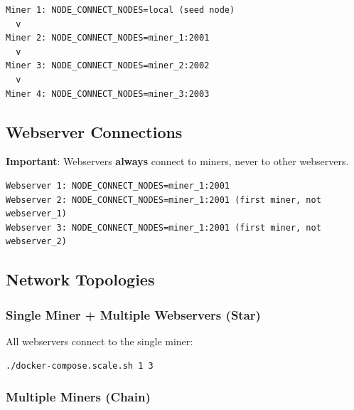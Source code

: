 \begin{listing}[htbp]
\caption{Miner Network Topology}
\label{lst:ch22-miner-chain}
\begin{verbatim}
Miner 1: NODE_CONNECT_NODES=local (seed node)
  v
Miner 2: NODE_CONNECT_NODES=miner_1:2001
  v
Miner 3: NODE_CONNECT_NODES=miner_2:2002
  v
Miner 4: NODE_CONNECT_NODES=miner_3:2003
\end{verbatim}
\end{listing}

\subsection{Webserver Connections}

\textbf{Important}: Webservers \textbf{always} connect to miners, never to other webservers.

\begin{listing}[H]
\caption{Webserver Network Topology}
\label{lst:ch22-webserver-topology}
\begin{verbatim}
Webserver 1: NODE_CONNECT_NODES=miner_1:2001
Webserver 2: NODE_CONNECT_NODES=miner_1:2001 (first miner, not webserver_1)
Webserver 3: NODE_CONNECT_NODES=miner_1:2001 (first miner, not webserver_2)
\end{verbatim}
\end{listing}

\subsection{Network Topologies}

\subsubsection{Single Miner + Multiple Webservers (Star)}

All webservers connect to the single miner:

\begin{listing}[htbp]
\caption{Star Topology: One Miner, Multiple Webservers}
\label{lst:ch22-star-topology}
\begin{verbatim}
./docker-compose.scale.sh 1 3
\end{verbatim}
\end{listing}

\subsubsection{Multiple Miners (Chain)}

